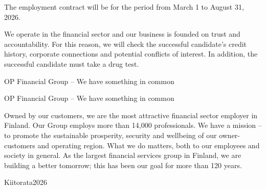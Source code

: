 \documentclass[a4paper,11pt]{article}
\begin{document}
The employment contract will be for the period from March 1 to August 31, 2026.

We operate in the financial sector and our business is founded on trust and accountability. For this reason, we will check the successful candidate's credit history, corporate connections and potential conflicts of interest. In addition, the successful candidate must take a drug test.

OP Financial Group – We have something in common

OP Financial Group – We have something in common

Owned by our customers, we are the most attractive financial sector employer in Finland. Our Group employs more than 14,000 professionals. We have a mission – to promote the sustainable prosperity, security and wellbeing of our owner-customers and operating region. What we do matters, both to our employees and society in general. As the largest financial services group in Finland, we are building a better tomorrow; this has been our goal for more than 120 years.

Kiitorata2026
\end{document}
